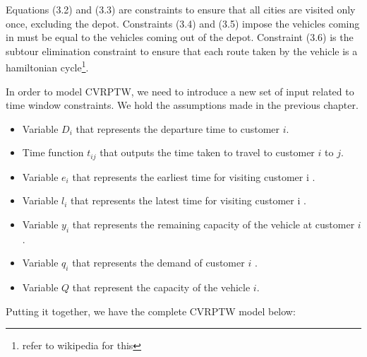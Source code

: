 \documentclass[a4paper, 12pt]{report}
\begin{document}
Equations (3.2) and (3.3) are constraints to ensure that all cities are visited only once, excluding the depot. Constraints (3.4) and (3.5)
impose the vehicles coming in must be equal to the vehicles coming out of the depot. Constraint (3.6) is the subtour
elimination constraint to ensure that each route taken by the vehicle is a hamiltonian cycle\footnote{refer to wikipedia for this}.

In order to model CVRPTW, we need to introduce a new set of input related to time window constraints. We hold the assumptions made in the previous chapter.
\begin{itemize}
\item Variable \(D_{i}\) that represents the departure time to customer \(i\).
\item Time function \(t_{ij}\) that outputs the time taken to travel to customer \(i\) to \(j\).
\item Variable \(e_{i}\) that represents the earliest time for visiting customer i .
\item Variable \(l_{i}\) that represents the latest time for visiting customer i .
\item Variable \(y_{i}\) that represents the remaining capacity of the vehicle at customer \(i\) .
\item Variable \(q_{i}\) that represents the demand of customer \(i\) .
\item Variable \(Q\) that represent the capacity of the vehicle \(i\).
\end{itemize}
Putting it together, we have the complete CVRPTW model below:

\vspace{0.5cm}
\end{document}
